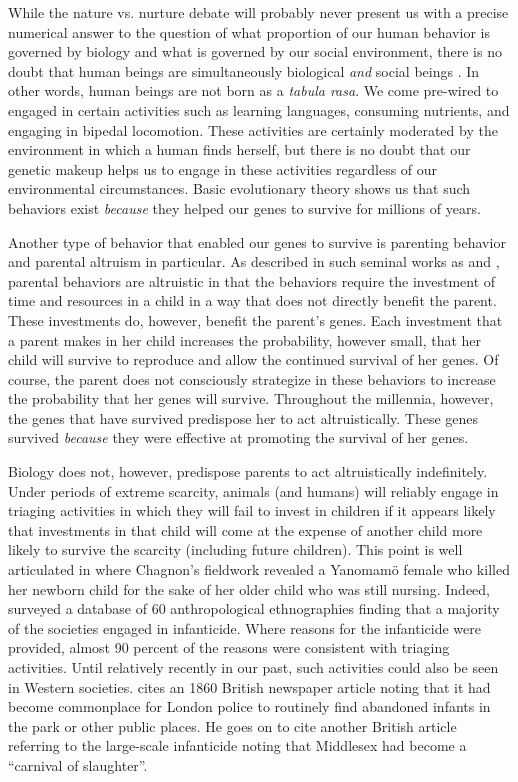 \documentclass[1p, review]{elsarticle}\usepackage[]{graphicx}\usepackage[]{color}
\begin{document}
While the nature vs. nurture debate will probably never present us with a precise numerical answer to the question of what proportion of our human behavior is governed by biology and what is governed by our social environment, there is no doubt that human beings are simultaneously biological \emph{and} social beings \citep[see for example][]{Plomin1994, Ridley2003}. In other words, human beings are not born as a \emph{tabula rasa}. We come pre-wired to engaged in certain activities such as learning languages, consuming nutrients, and engaging in bipedal locomotion. These activities are certainly moderated by the environment in which a human finds herself, but there is no doubt that our genetic makeup helps us to engage in these activities regardless of our environmental circumstances. Basic evolutionary theory shows us that such behaviors exist \emph{because} they helped our genes to survive for millions of years. 

Another type of behavior that enabled our genes to survive is parenting behavior and parental altruism in particular. As described in such seminal works as \citet{Hamilton1964} and \citet{Trivers1974}, parental behaviors are altruistic in that the behaviors require the investment of time and resources in a child in a way that does not directly benefit the parent. These investments do, however, benefit the parent's genes. Each investment that a parent makes in her child increases the probability, however small, that her child will survive to reproduce and allow the continued survival of her genes. Of course, the parent does not consciously strategize in these behaviors to increase the probability that her genes will survive. Throughout the millennia, however, the genes that have survived predispose her to act altruistically. These genes survived \emph{because} they were effective at promoting the survival of her genes. 

Biology does not, however, predispose parents to act altruistically indefinitely. Under periods of extreme scarcity, animals (and humans) will reliably engage in triaging activities in which they will fail to invest in children if it appears likely that investments in that child will come at the expense of another child more likely to survive the scarcity (including future children). This point is well articulated in \citet{Chagnon1983} where Chagnon's fieldwork revealed a Yanomam{\"o} female who killed her newborn child for the sake of her older child who was still nursing. Indeed, \citet{Daly1988} surveyed a database of 60 anthropological ethnographies finding that a majority of the societies engaged in infanticide. Where reasons for the infanticide were provided, almost 90 percent of the reasons were consistent with triaging activities. Until relatively recently in our past, such activities could also be seen in Western societies. \citet{Milner1998} cites an 1860 British newspaper article noting that it had become commonplace for London police to routinely find abandoned infants in the park or other public places. He goes on to cite another British article referring to the large-scale infanticide noting that Middlesex had become a ``carnival of slaughter''. 
\end{document}
